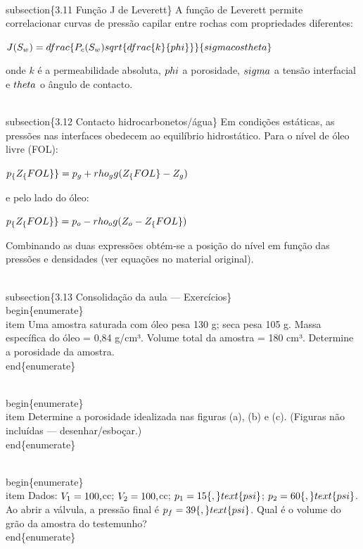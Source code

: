 \documentclass[11pt,a4paper]{article}
\begin{document}
\begin{enumerate}
{\\subsection\{3.11 Função J de Leverett\}
A função de Leverett permite correlacionar curvas de pressão capilar entre rochas com propriedades diferentes:

$J(S_w)=\\dfrac\{P_c(S_w)\\sqrt\{\\dfrac\{k\}\{\\phi\}\}\}\{\\sigma\\cos\\theta\}$

onde $k$ é a permeabilidade absoluta, $\\phi$ a porosidade, $\\sigma$ a tensão interfacial e $\\theta$ o ângulo de contacto.

\\subsection\{3.12 Contacto hidrocarbonetos/água\}
Em condições estáticas, as pressões nas interfaces obedecem ao equilíbrio hidrostático. Para o nível de óleo livre (FOL):

$p_\{Z_\{FOL\}\} = p_g + \\rho_g g (Z_\{FOL\}-Z_g)$

e pelo lado do óleo:

$p_\{Z_\{FOL\}\} = p_o - \\rho_o g (Z_o - Z_\{FOL\})$

Combinando as duas expressões obtém‑se a posição do nível em função das pressões e densidades (ver equações no material original).

\\subsection\{3.13 Consolidação da aula — Exercícios\}
\\begin\{enumerate\}
\\item Uma amostra saturada com óleo pesa 130 g; seca pesa 105 g. Massa específica do óleo = 0,84 g/cm³. Volume total da amostra = 180 cm³. Determine a porosidade da amostra.
\\end\{enumerate\}

\\begin\{enumerate\}
\\item Determine a porosidade idealizada nas figuras (a), (b) e (c). (Figuras não incluídas — desenhar/esboçar.)
\\end\{enumerate\}

\\begin\{enumerate\}
\\item Dados: $V_1=100\\,$cc; $V_2=100\\,$cc; $p_1=15\{\\,\}\\text\{psi\}$; $p_2=60\{\\,\}\\text\{psi\}$. Ao abrir a válvula, a pressão final é $p_f=39\{\\,\}\\text\{psi\}$. Qual é o volume do grão da amostra do testemunho?
\\end\{enumerate\}

}
\end{enumerate}
\end{document}
